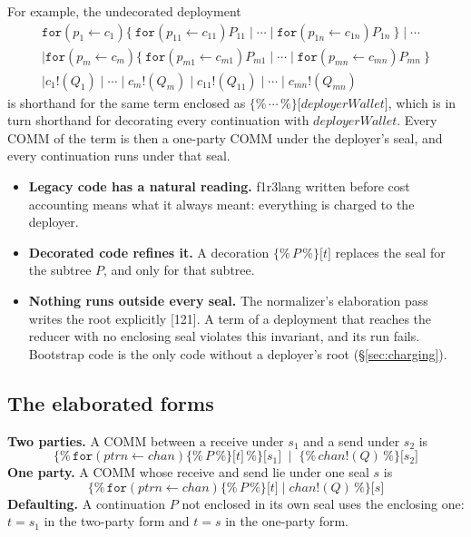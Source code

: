 \documentclass[10.5pt]{article}
\newcommand{\ob}{\texttt{\{\%}}
\newcommand{\cb}{\texttt{\%\}}}
\newcommand{\sealed}[2]{\ensuremath{\ob\,#1\,\cb\texttt{[}#2\texttt{]}}}
\newcommand{\D}[1]{{\color{muted}\small[#1]}}
\begin{document}
For example, the undecorated deployment
\begin{multline*}
\mathtt{for}(p_1 \leftarrow c_1)\{\ \mathtt{for}(p_{11} \leftarrow c_{11})P_{11} \mid \cdots \mid \mathtt{for}(p_{1n} \leftarrow c_{1n})P_{1n}\ \} \mid \cdots \\
\mid \mathtt{for}(p_m \leftarrow c_m)\{\ \mathtt{for}(p_{m1} \leftarrow c_{m1})P_{m1} \mid \cdots \mid \mathtt{for}(p_{mn} \leftarrow c_{mn})P_{mn}\ \} \\
\mid c_1!(Q_1) \mid \cdots \mid c_m!(Q_m) \mid c_{11}!(Q_{11}) \mid \cdots \mid c_{mn}!(Q_{mn})
\end{multline*}
is shorthand for the same term enclosed as \sealed{\cdots}{\mathit{deployerWallet}}, which is in turn shorthand for decorating every continuation with $\mathit{deployerWallet}$. Every COMM of the term is then a one-party COMM under the deployer's seal, and every continuation runs under that seal.
\begin{itemize}
\item \textbf{Legacy code has a natural reading.} f1r3lang written before cost accounting means what it always meant: everything is charged to the deployer.
\item \textbf{Decorated code refines it.} A decoration \sealed{P}{t} replaces the seal for the subtree $P$, and only for that subtree.
\item \textbf{Nothing runs outside every seal.} The normalizer's elaboration pass writes the root explicitly \D{121}. A term of a deployment that reaches the reducer with no enclosing seal violates this invariant, and its run fails. Bootstrap code is the only code without a deployer's root (\S\ref{sec:charging}).
\end{itemize}

\subsection{The elaborated forms}\label{sec:forms}

\begin{keypoint}
\textbf{Two parties.} A COMM between a receive under $s_1$ and a send under $s_2$ is
\[
\sealed{\mathtt{for}(\mathit{ptrn} \leftarrow \mathit{chan})\sealed{P}{t}}{s_1} \;\mid\; \sealed{\mathit{chan}!(Q)}{s_2}
\]
\textbf{One party.} A COMM whose receive and send lie under one seal $s$ is
\[
\sealed{\mathtt{for}(\mathit{ptrn} \leftarrow \mathit{chan})\sealed{P}{t} \mid \mathit{chan}!(Q)}{s}
\]
\textbf{Defaulting.} A continuation $P$ not enclosed in its own seal uses the enclosing one: $t = s_1$ in the two-party form and $t = s$ in the one-party form.
\end{keypoint}
\end{document}
